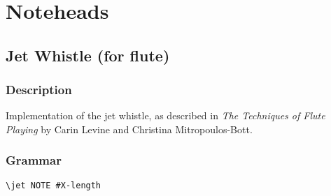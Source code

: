 \chapter {Noteheads}



\section {Jet Whistle (for flute)}
\hfill

\subsection{Description}
Implementation of the jet whistle, as described in \textit{The Techniques of Flute Playing} by Carin Levine and Christina Mitropoulos-Bott.\autocite[18]{RN1695} 

\subsection{Grammar}
\begin{verbatim}
\jet NOTE #X-length
\end{verbatim}
